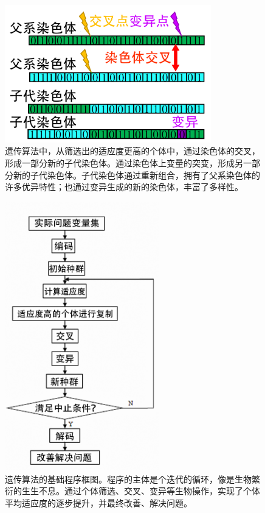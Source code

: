 \begin{figure}[!htbp]
    \centering
    \includegraphics[width=0.8\textwidth]{Img/2-2.png}
    \caption{遗传算法中，从筛选出的适应度更高的个体中，通过染色体的交叉，形成一部分新的子代染色体。通过染色体上变量的突变，形成另一部分新的子代染色体。子代染色体通过重新组合，拥有了父系染色体的许多优异特性；也通过变异生成的新的染色体，丰富了多样性。}
    \label{fig:2-2}
\end{figure}
\begin{figure}[!htbp]
    \centering
    \includegraphics[width=0.6\textwidth]{Img/2-3.png}
    \caption{遗传算法的基础程序框图。程序的主体是个迭代的循环，像是生物繁衍的生生不息。通过个体筛选、交叉、变异等生物操作，实现了个体平均适应度的逐步提升，并最终改善、解决问题。}
    \label{fig:2-3}
\end{figure}

